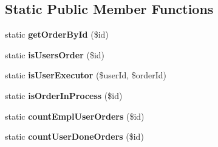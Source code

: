 \subsection*{Static Public Member Functions}
\begin{DoxyCompactItemize}
\item 
\hypertarget{classapp_1_1models_1_1_order_abc825d65e740b81ed3dda6d3ad62760d}{}\label{classapp_1_1models_1_1_order_abc825d65e740b81ed3dda6d3ad62760d} 
static {\bfseries get\+Order\+By\+Id} (\$id)
\item 
\hypertarget{classapp_1_1models_1_1_order_a783e0463c7c27ee9b15b1e3bc345550d}{}\label{classapp_1_1models_1_1_order_a783e0463c7c27ee9b15b1e3bc345550d} 
static {\bfseries is\+Users\+Order} (\$id)
\item 
\hypertarget{classapp_1_1models_1_1_order_abbea95ee2b9586ebf32787e9807a9a0a}{}\label{classapp_1_1models_1_1_order_abbea95ee2b9586ebf32787e9807a9a0a} 
static {\bfseries is\+User\+Executor} (\$user\+Id, \$order\+Id)
\item 
\hypertarget{classapp_1_1models_1_1_order_a0b89352bd73b940331e04c65a13167a9}{}\label{classapp_1_1models_1_1_order_a0b89352bd73b940331e04c65a13167a9} 
static {\bfseries is\+Order\+In\+Process} (\$id)
\item 
\hypertarget{classapp_1_1models_1_1_order_ad123b6765ef4118ff6f4c2840a6f634d}{}\label{classapp_1_1models_1_1_order_ad123b6765ef4118ff6f4c2840a6f634d} 
static {\bfseries count\+Empl\+User\+Orders} (\$id)
\item 
\hypertarget{classapp_1_1models_1_1_order_a82f98573ef4d48854a42bceb54e83815}{}\label{classapp_1_1models_1_1_order_a82f98573ef4d48854a42bceb54e83815} 
static {\bfseries count\+User\+Done\+Orders} (\$id)
\end{DoxyCompactItemize}
